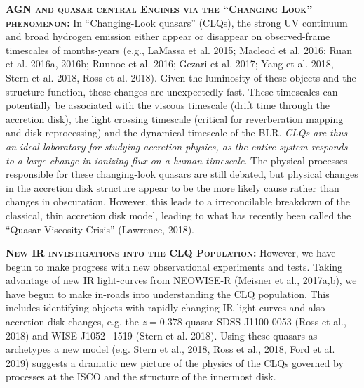 \documentclass[12pt]{article}
\begin{document}
\smallskip
\smallskip
\noindent
\textbf{\textsc{AGN and quasar central Engines via the ``Changing Look'' phenomenon: }} 
In ``Changing-Look quasars'' (CLQs), the strong UV continuum and broad hydrogen emission either appear or disappear on observed-frame timescales of months-years (e.g., LaMassa et al. 2015; Macleod et al. 2016; Ruan et al. 2016a, 2016b; Runnoe et al. 2016; Gezari et al. 2017; Yang et al. 2018, Stern et al. 2018, Ross et al. 2018). 
Given the luminosity of these objects and the structure function, these changes are unexpectedly fast. 
These timescales can potentially be associated with the viscous timescale (drift time through the accretion disk), the light crossing timescale (critical for reverberation mapping and disk reprocessing) and the dynamical timescale of the BLR.  {\it CLQs are thus an ideal laboratory for studying accretion physics, as the entire system responds to a large change in ionizing flux on a human timescale}. 
The physical processes responsible for these changing-look quasars are still debated, but physical changes in the accretion disk structure appear to be the more likely cause rather than changes in obscuration. However, this leads to a irreconcilable breakdown of the classical, thin accretion disk model, leading to what has recently been called the ``Quasar Viscosity Crisis'' (Lawrence, 2018). 

\smallskip
\smallskip
\noindent
\textbf{\textsc{New IR investigations into the CLQ Population:}}
However, we have begun to make progress with new observational
experiments and tests.  Taking advantage of new IR light-curves from
NEOWISE-R (Meisner et al., 2017a,b), we have begun to make in-roads
into understanding the CLQ population.  This includes identifying
objects with rapidly changing IR light-curves and also accretion disk
changes, e.g. the $z=0.378$ quasar SDSS J1100-0053 (Ross et al., 2018)
and WISE J1052+1519 (Stern et al. 2018). Using these quasars as
archetypes a new model (e.g. Stern et al., 2018, Ross et al., 2018,
Ford et al. 2019) suggests a dramatic new picture of the physics of
the CLQs governed by processes at the ISCO and the structure of the
innermost disk.
\end{document}

